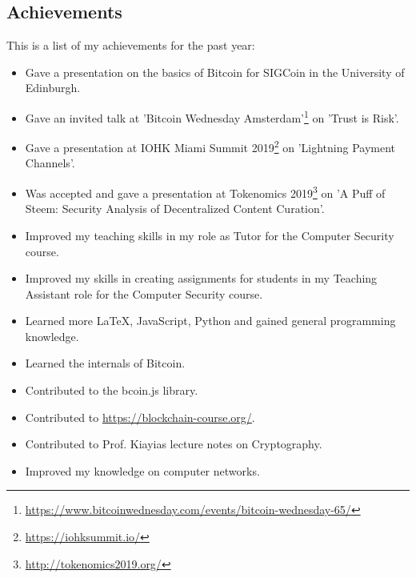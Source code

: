   \subsection{Achievements}
    This is a list of my achievements for the past year:
    \begin{itemize}
      \item Gave a presentation on the basics of Bitcoin for SIGCoin in the
      University of Edinburgh.
      \item Gave an invited talk at 'Bitcoin Wednesday
      Amsterdam'\footnote{\url{https://www.bitcoinwednesday.com/events/bitcoin-wednesday-65/}}
      on 'Trust is Risk'.
      \item Gave a presentation at IOHK Miami Summit
      2019\footnote{\url{https://iohksummit.io/}} on 'Lightning Payment
      Channels'.
      \item Was accepted and gave a presentation at Tokenomics
      2019\footnote{\url{http://tokenomics2019.org/}} on 'A Puff of Steem:
      Security Analysis of Decentralized Content Curation'.
      \item Improved my teaching skills in my role as Tutor for the Computer
      Security course.
      \item Improved my skills in creating assignments for students in my
      Teaching Assistant role for the Computer Security course.
      \item Learned more LaTeX, JavaScript, Python and gained general
      programming knowledge.
      \item Learned the internals of Bitcoin.
      \item Contributed to the bcoin.js library.
      \item Contributed to \url{https://blockchain-course.org/}.
      \item Contributed to Prof. Kiayias lecture notes on Cryptography.
      \item Improved my knowledge on computer networks.
    \end{itemize}
